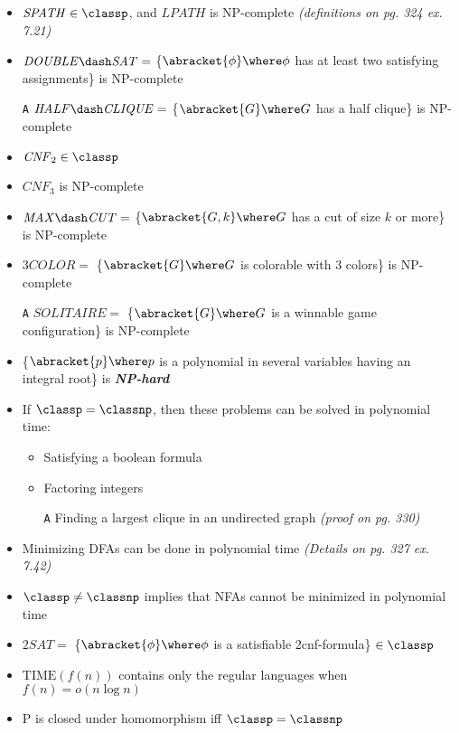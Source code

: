 \documentclass[12pt]{article} %
\newenvironment{theoremlist} {
    \begin{enumerate}[nosep,leftmargin=*,label={}]
} {
    \end{enumerate}
}
\begin{document}
\begin{theoremlist}
\begin{itemize}[nosep]
        \item $\mathit{SPATH}\in\classp$, and $\mathit{LPATH}$ is NP-complete \textit{(definitions on pg. 324 ex. 7.21)}
        \item $\mathit{DOUBLE\dash SAT}=$ \{$\abracket{\phi} \where \phi$ has at least two satisfying assignments\} is NP-complete
        \item[\texttt{A}] $\mathit{HALF\dash CLIQUE}=$ \{$\abracket{G} \where G$ has a half clique\} is NP-complete
        \item $\mathit{CNF}_2\in\classp$
        \item $\mathit{CNF}_3$ is NP-complete
        \item $\mathit{MAX\dash CUT}=$ \{$\abracket{G,k} \where G$ has a cut of size $k$ or more\} is NP-complete
        \item $\mathit{3COLOR}=$ \{$\abracket{G} \where G$ is colorable with 3 colors\} is NP-complete
        \item[\texttt{A}] $\mathit{SOLITAIRE}=$ \{$\abracket{G} \where G$ is a winnable game configuration\} is NP-complete
        \item \{$\abracket{p} \where p$ is a polynomial in several variables having an integral root\} is \textbf{\textit{NP-hard}}
        \vspace{0.25em}
        \item If $\classp=\classnp$, then these problems can be solved in polynomial time:
        \begin{itemize}[label=-]
            \item Satisfying a boolean formula
            \item Factoring integers
            \item[\texttt{A}] Finding a largest clique in an undirected graph \textit{(proof on pg. 330)}
        \end{itemize}
        \item Minimizing DFAs can be done in polynomial time \textit{(Details on pg. 327 ex. 7.42)}
        \item $\classp\neq\classnp$ implies that NFAs cannot be minimized in polynomial time
        \item $\mathit{2SAT}=$ \{$\abracket{\phi} \where \phi$ is a satisfiable 2cnf-formula\} $\in\classp$
        \item $\text{TIME}(f(n))$ contains only the regular languages when $f(n)=o(n\log{n})$
        \item P is closed under homomorphism iff $\classp=\classnp$
    \end{itemize}


\end{theoremlist}
\end{document}
